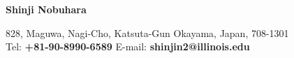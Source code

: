 \begin{center}
    \begin{large}
       \textbf{Shinji Nobuhara}\\
    \end{large}
    828, Maguwa, Nagi-Cho, Katsuta-Gun Okayama, Japan, 708-1301 \\
    Tel: \textbf{+81-90-8990-6589} \hfill E-mail: \textbf{shinjin2@illinois.edu} \\
\end{center}